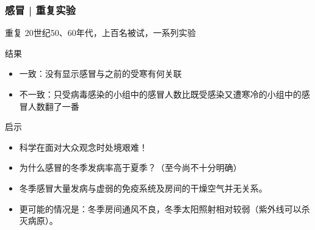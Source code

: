 \begin{frame}
  \frametitle{感冒 | 重复实验}
  \begin{block}{重复}
      20世纪50、60年代，上百名被试，一系列实验
  \end{block}
  \pause
  \begin{block}{结果}
    \begin{itemize}
      \item 一致：没有显示感冒与之前的受寒有何关联
      \item 不一致：只受病毒感染的小组中的感冒人数比既受感染又遭寒冷的小组中的感冒人数翻了一番
    \end{itemize}
  \end{block}
  \pause
  \begin{block}{启示}
    \begin{itemize}
      \item 科学在面对大众观念时处境艰难！
      \item 为什么感冒的冬季发病率高于夏季？（至今尚不十分明确）
      \item 冬季感冒大量发病与虚弱的免疫系统及房间的干燥空气并无关系。
      \item 更可能的情况是：冬季房间通风不良，冬季太阳照射相对较弱（紫外线可以杀灭病原）。
    \end{itemize}
  \end{block}
\end{frame}

% 
\section{}

% 
\section{}

% 
\section{}


